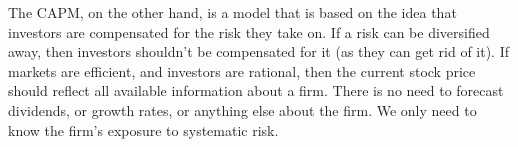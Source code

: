 The CAPM, on the other hand, is a model that is based on the idea that investors are compensated for the risk they take on. If a risk can be diversified away, then
investors shouldn't be compensated for it (as they can get rid of it).
If markets are efficient, and investors are rational, then the current stock price should reflect all available information about a firm.
There is no need to forecast dividends, or growth rates, or anything else about the firm. We only need to know the firm's exposure to systematic risk.
